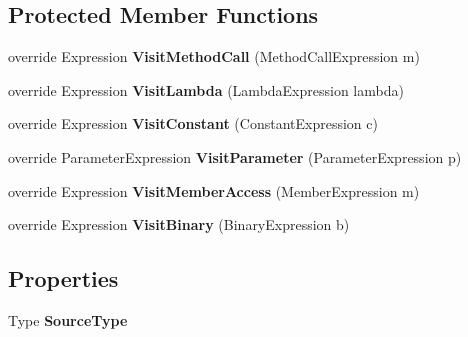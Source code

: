 \subsection*{Protected Member Functions}
\begin{DoxyCompactItemize}
\item 
\mbox{\label{class_linq_1_1_post_gre_sql_expression_tree_visitor_a6a24d5c5316fe2bd9ec99538a6fd657f}} 
override Expression {\bfseries Visit\+Method\+Call} (Method\+Call\+Expression m)
\item 
\mbox{\label{class_linq_1_1_post_gre_sql_expression_tree_visitor_aa441c8aabe0df4cd6e6ddeed989cc633}} 
override Expression {\bfseries Visit\+Lambda} (Lambda\+Expression lambda)
\item 
\mbox{\label{class_linq_1_1_post_gre_sql_expression_tree_visitor_af65b4b608ccecbe6d5a769cf7380a911}} 
override Expression {\bfseries Visit\+Constant} (Constant\+Expression c)
\item 
\mbox{\label{class_linq_1_1_post_gre_sql_expression_tree_visitor_ac6fc4590508cd7cf3bf6db6f306c2db9}} 
override Parameter\+Expression {\bfseries Visit\+Parameter} (Parameter\+Expression p)
\item 
\mbox{\label{class_linq_1_1_post_gre_sql_expression_tree_visitor_ab9a58f96730dc61df9fa0a138f9aebc9}} 
override Expression {\bfseries Visit\+Member\+Access} (Member\+Expression m)
\item 
\mbox{\label{class_linq_1_1_post_gre_sql_expression_tree_visitor_aadc30de6c3e08ef754d00bf23903e85b}} 
override Expression {\bfseries Visit\+Binary} (Binary\+Expression b)
\end{DoxyCompactItemize}
\subsection*{Properties}
\begin{DoxyCompactItemize}
\item 
\mbox{\label{class_linq_1_1_post_gre_sql_expression_tree_visitor_ab0296a8f9e29757e1253646102ec37f8}} 
Type {\bfseries Source\+Type}
\end{DoxyCompactItemize}


